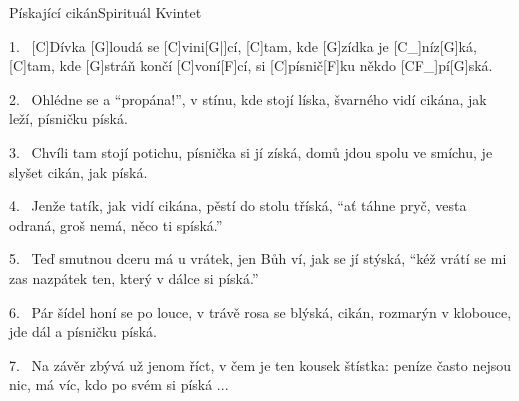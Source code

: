 %
\begin{song}{Pískající cikán}{Spirituál Kvintet}

\begin{xverse}{1.~}
[\large C]Dívka [\large G]loudá se [\large C]vini[\large G|]{cí,} [\large C]tam, kde [\large G]zídka je [\large C_]{níz}[\large G]{ká},
[\large C]tam, kde [\large G]stráň končí [\large C]voní[\large F]cí, si [\large C]písnič[\large F]ku někdo [\large CF_]{pí}[\large G]{ská}.
\end{xverse}

\begin{xverse}{2.~}
Ohlédne se a ``propána!'', v stínu, kde stojí líska,
švarného vidí cikána, jak leží, písničku píská.
\end{xverse}


\begin{xverse}{3.~}
Chvíli tam stojí potichu, písnička si jí získá,
domů jdou spolu ve smíchu, je slyšet cikán, jak píská.
\end{xverse}


\begin{xverse}{4.~}
Jenže tatík, jak vidí cikána, pěstí do stolu tříská,
``ať táhne pryč, vesta odraná, groš nemá, něco ti spíská.''
\end{xverse}


\begin{xverse}{5.~}
Teď smutnou dceru má u vrátek, jen Bůh ví, jak se jí stýská,
``kéž vrátí se mi zas nazpátek ten, který v dálce si píská.''
\end{xverse}


\begin{xverse}{6.~}
Pár šídel honí se po louce, v trávě rosa se blýská,
cikán, rozmarýn v klobouce, jde dál a písničku píská.
\end{xverse}


\begin{xverse}{7.~}
Na závěr zbývá už jenom říct, v čem je ten kousek štístka:
peníze často nejsou nic, má víc, kdo po svém si píská ...
\end{xverse}

\end{song}

